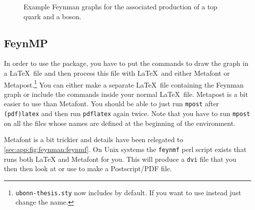 \begin{figure}[htbp]
\begin{tcblisting}{}
\centering
{}
\quad
{}
\caption{Example Feynman graphs for the associated production
  of a top quark and a \PZ boson.}%
\label{fig:tZq-pyfeyn}
\end{tcblisting}
\end{figure}


\subsection{FeynMP}%
\label{sec:fig:feynman:feynmp}

In order to use the  package, you have to put
the commands to draw the graph in a \LaTeX\ file and then process
this file with \LaTeX\ and either Metafont or
Metapost.\footnote{\texttt{ubonn-thesis.sty} now includes 
  by default.
  If you want to use  instead just change the name.} 
You can either make
a separate \LaTeX\ file containing the Feynman graph or include the
commands inside your normal \LaTeX\ file.
Metapost is a bit easier to use than Metafont.
You should be able to just run
\texttt{mpost} after \texttt{(pdf)latex} and then run %
\texttt{pdflatex} again twice.
Note that you have to run
\texttt{mpost} on all the files whose names are defined at the
beginning of the  environment.

Metafont is a bit trickier and details have been relegated to
\cref{sec:app:fig:feynman:feynmf}. 
On Unix systems the \texttt{feynmf} perl script exists that runs both \LaTeX{} and
Metafont for you. This will produce a \texttt{dvi} file that you then
then look at or use to make a Postscript/PDF file.

